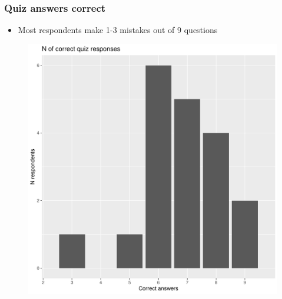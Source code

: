 \documentclass[11pt,hyperref={bookmarks=false}]{beamer}
\begin{document}
\begin{frame}
\frametitle{Quiz answers correct}
\begin{itemize}
\item Most respondents make 1-3 mistakes out of 9 questions
\end{itemize}
\begin{figure}[h]
\includegraphics[scale=0.4]{Graphs/COMPRplot.pdf}
\end{figure}
\end{frame}
\end{document}
